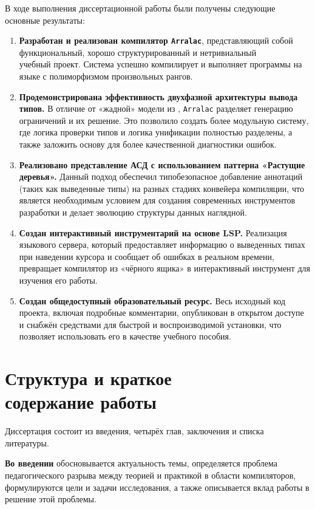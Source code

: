 В ходе выполнения диссертационной работы были получены следующие основные результаты:
\begin{enumerate}
    \item \textbf{Разработан и реализован компилятор \texttt{Arralac}}, представляющий собой функциональный, хорошо структурированный и нетривиальный \\ учебный проект. Система успешно компилирует и выполняет программы на языке с полиморфизмом произвольных рангов.
    \item \textbf{Продемонстрирована эффективность двухфазной архитектуры вывода типов.} В отличие от «жадной» модели из \cite{jones-practical-2007}, \texttt{Arralac} разделяет генерацию ограничений и их решение. Это позволило создать более модульную систему, где логика проверки типов и логика унификации полностью разделены, а также заложить основу для более качественной диагностики ошибок.
    \item \textbf{Реализовано представление АСД с использованием паттерна «Растущие деревья».} Данный подход обеспечил типобезопасное добавление аннотаций (таких как выведенные типы) на разных стадиях конвейера компиляции, что является необходимым условием для создания современных инструментов разработки и делает эволюцию структуры данных наглядной.
    \item \textbf{Создан интерактивный инструментарий на основе LSP.} Реализация языкового сервера, который предоставляет информацию о выведенных типах при наведении курсора и сообщает об ошибках в реальном времени, превращает компилятор из «чёрного ящика» в интерактивный инструмент для изучения его работы.
    \item \textbf{Создан общедоступный образовательный ресурс.} Весь исходный код проекта, включая подробные комментарии, опубликован в открытом доступе и снабжён средствами для быстрой и воспроизводимой установки, что позволяет использовать его в качестве учебного пособия.
\end{enumerate}

\chapter[Структура и краткое содержание работы]{Структура и краткое \\ содержание работы}

Диссертация состоит из введения, четырёх глав, заключения и списка литературы.

\textbf{Во введении} обосновывается актуальность темы, определяется проблема педагогического разрыва между теорией и практикой в области компиляторов, формулируются цели и задачи исследования, а также описывается вклад работы в решение этой проблемы.

